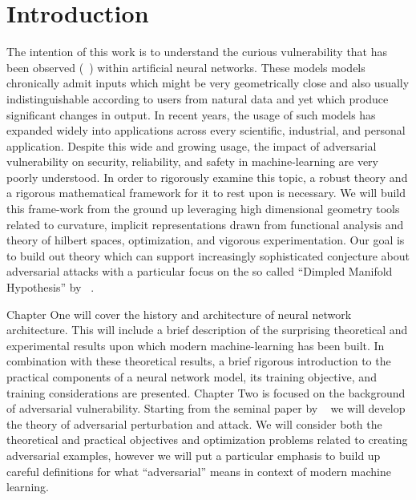 \chapter{Introduction} %
\label{Chapter1} %

The intention of this work is to understand the curious vulnerability
that has been observed (~\cite{szegedy2013}) within artificial neural
networks. These models models chronically admit inputs which might be
very geometrically close and also usually indistinguishable according
to users from natural data and yet which produce significant changes
in output. In recent years, the usage of such models has expanded
widely into applications across every scientific, industrial, and
personal application. Despite this wide and growing usage,
the impact of adversarial vulnerability on security, reliability, and
safety in machine-learning are very poorly understood. In order to
rigorously examine this topic, a robust theory and a rigorous
mathematical framework for it to rest upon is necessary. We will build
this frame-work from the ground up leveraging high dimensional
geometry tools related to curvature, implicit representations drawn
from functional analysis and theory of hilbert spaces, optimization,
and vigorous experimentation. Our goal is to build out theory which
can support increasingly sophisticated conjecture about adversarial
attacks with a particular focus on the so called ``Dimpled Manifold
Hypothesis'' by ~\cite{shamir2021dimpled}.

Chapter One will cover the history and architecture of neural network
architecture. This will include a brief description of the surprising
theoretical and experimental results upon which modern
machine-learning has been built. In combination with these theoretical
results, a brief rigorous introduction to the practical components of
a neural network model, its training objective, and training
considerations are presented. Chapter Two is focused on the background
of adversarial vulnerability. Starting from the seminal paper by
~\cite{szegedy2013} we will develop the theory of adversarial
perturbation and attack. We will consider both the theoretical and
practical objectives and optimization problems related to creating
adversarial examples, however we will put a particular emphasis to
build up careful definitions for what ``adversarial'' means in context
of modern machine learning.

